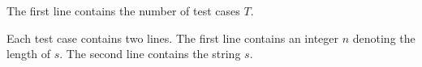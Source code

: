 The first line contains the number of test cases $T$.

Each test case contains two lines.
The first line contains an integer $n$ denoting the length of $s$.
The second line contains the string $s$.
